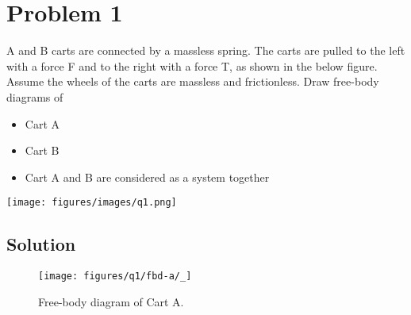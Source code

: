 \section*{Problem 1}

A and B carts are connected by a massless spring.
The carts are pulled to the left with a force F and to the right with a force T, as shown in the below figure.
Assume the wheels of the carts are massless and frictionless.
Draw free-body diagrams of
\begin{itemize}[itemsep=3pt,parsep=0pt,topsep=5pt,partopsep=0pt]
    \item Cart A
    \item Cart B
    \item Cart A and B are considered as a system together
\end{itemize}

\begin{figure*}[h]
    \centering
    \texttt{[image: figures/images/q1.png]}
\end{figure*}

\subsection*{Solution}

\begin{figure}[h]
    \centering
    \texttt{[image: figures/q1/fbd-a/\_]}
    \caption{
        Free-body diagram of Cart A.
    }
\end{figure}
